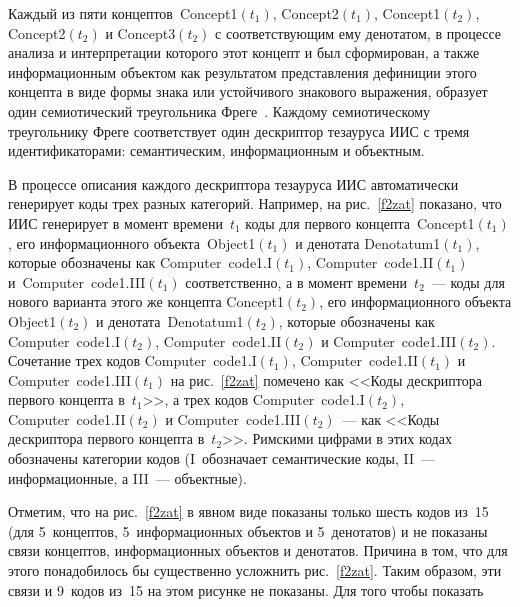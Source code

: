 \begin{multicols}{2}
   Каждый из пяти концептов~Concept1$(t_1)$, Concept2$(t_1)$, Concept1$(t_2)$, 
Concept2$(t_2)$ и Concept3$(t_2)$ с соответствующим ему денотатом, в процессе анализа и 
интерпретации которого этот концепт и был сформирован, а также информационным 
объектом как результатом представления дефиниции этого концепта в виде формы знака или 
устойчивого знакового выражения, образует один семиотический треугольника 
Фреге~\cite{2zat}. Каждому семиотическому треугольнику Фреге соответствует один 
дескриптор тезауруса ИИС с тремя идентификаторами: семантическим, информационным и объектным.
   
   В процессе описания каждого дескриптора тезауруса ИИС автоматически генерирует 
коды трех разных категорий. Например, на рис.~\ref{f2zat} показано, что ИИС генерирует в 
момент времени~$t_1$ коды для первого концепта~Concept1$(t_1)$, его информационного 
объекта~Object1$(t_1)$ и дено\-тата Denotatum1$(t_1)$, которые обозначены как\linebreak 
   Com\-put\-er\ code1.I$(t_1)$, Com\-put\-er\ code1.II$(t_1)$ и~Com\-put\-er\ code1.III$(t_1)$ 
соответственно, а в момент времени~$t_2$~--- коды для нового варианта этого же концепта 
Concept1$(t_2)$, его информационного \mbox{объекта} Object1$(t_2)$ и денотата~Denotatum1$(t_2)$, 
которые обозначены как Com\-put\-er\ code1.I$(t_2)$, Com\-put\-er\ code1.II$(t_2)$ и Com\-put\-er\ 
code1.III$(t_2)$. Сочетание трех кодов Com\-put\-er\ code1.I$(t_1)$, Com\-put\-er\ code1.II$(t_1)$ 
и Com\-put\-er\ code1.III$(t_1)$ на рис.~\ref{f2zat} помечено как <<Коды дескриптора 
первого концепта в~$t_1$>>, а трех кодов Com\-put\-er\ code1.I$(t_2)$, Com\-put\-er\ code1.II$(t_2)$ 
и Com\-put\-er\ code1.III$(t_2)$~--- как <<Коды дескриптора первого концепта в~$t_2$>>. 
Римскими циф\-ра\-ми в этих кодах обозначены категории кодов (I~обозначает семантические 
коды, II~--- информационные, а III~--- объектные).
   
   Отметим, что на рис.~\ref{f2zat} в явном виде показаны только шесть кодов из~15 (для 
5~концеп\-тов, 5~информационных объектов и 5~денота\-тов) и не показаны связи концептов,
информационных объектов и денотатов. Причина в том, что для этого понадобилось бы существенно усложнить 
рис.~\ref{f2zat}. Таким образом, эти связи и 9~кодов из~15 на этом рисунке не показаны. Для того 
чтобы показать\linebreak
\vspace*{-12pt}
\pagebreak

\end{multicols}

